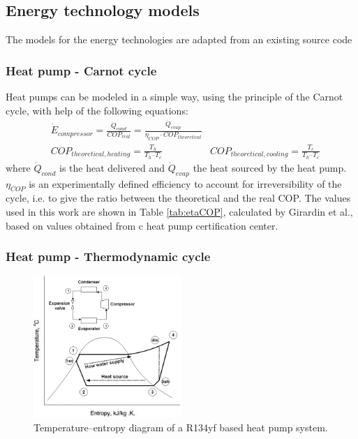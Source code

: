 \documentclass{article}
\begin{document}
\subsection{Energy technology models}\label{ss:et}
The models for the energy technologies are adapted from an existing source code \cite{suciuEnergyautonomousCitiesUsing2016a}

\subsubsection{Heat pump - Carnot cycle}\label{sss:hp_carnot}
Heat pumps can be modeled in a simple way, using the principle of the Carnot cycle, with help of the following equations:
\begin{align}
    & \dot{E}_{compressor} = \frac{\dot{Q}_{cond}}{COP_{real}} = \frac{\dot{Q}_{evap}}{\eta_{COP} \cdot COP_{theoretical}} \\
    & COP_{theoretical, heating} =  \frac{T_{h}}{T_{h} – T_{c}}  
    & COP_{theoretical, cooling} =  \frac{T_{c}}{T_{h} – T_{c}} 
\end{align}
where $\dot{Q}_{cond}$ is the heat delivered and $\dot{Q}_{evap}$ the heat sourced by the heat pump. $\eta_{COP}$ is an experimentally defined efficiency to account for irreversibility of the cycle, i.e. to give the ratio between the theoretical and the real COP. The values used in this work are shown in Table \ref{tab:etaCOP}, calculated by Girardin et al.\cite{girardinEnerGisGeographicalInformation2010}, based on values obtained from c heat pump certification center\cite{NTBBuchsInstitut}. \\



\subsubsection{Heat pump - Thermodynamic cycle}\label{sss:hp_thermo}

\begin{figure}[htp]
	\centering
	\includegraphics[width=0.5\textwidth]{HP_cylce_ref.png}
	\caption{Temperature–entropy diagram of a R134yf based heat pump system.}
	\label{fig:hp_ref}
\end{figure}
\end{document}

